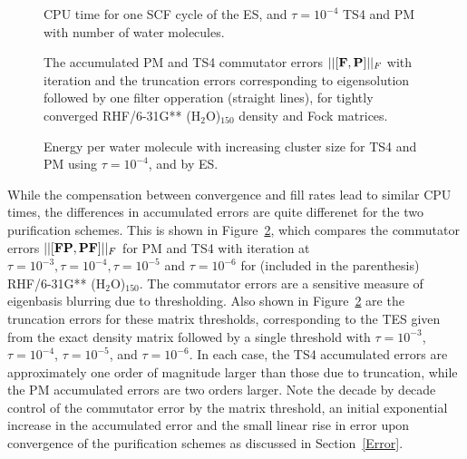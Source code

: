 \commentoutA{\documentclass[prb,aps,twocolumn,twocolumngrid,secnumarabic,superbib,hyperref]{revtex4}}
\begin{document}
{\begin{figure}[b]
\caption{CPU time for one SCF cycle of the ES, and 
	 $\tau=10^{-4}$ TS4 and PM with number of water molecules.}\label{cputimes}
\end{figure}

\begin{figure}[b]
\caption{The accumulated PM and TS4 commutator errors $||[{\bf F ,P }]||_F$ 
with iteration and the truncation errors corresponding to eigensolution followed
by one filter opperation (straight lines), for tightly converged RHF/6-31G** (H$_2$O)$_{150}$ density 
and Fock matrices.}\label{commerrors}
\end{figure}

\begin{figure}[b]
\caption{Energy per water molecule with increasing cluster size for TS4 and PM 
         using $\tau=10^{-4}$, and by ES.}\label{waterenergyerrors}
\end{figure}

While the compensation between convergence and fill rates lead to similar CPU times, 
the differences in accumulated errors are quite differenet for the two purification schemes.
This is shown in Figure~\ref{commerrors}, which compares the commutator errors $||[{\bf FP,PF}]||_F$
for PM and TS4 with iteration at $\tau=10^{-3}, \tau=10^{-4}, \tau=10^{-5}$ and $\tau=10^{-6}$
for (included in the parenthesis) RHF/6-31G** (H$_2$O)$_{150}$. 
The commutator errors are a sensitive measure of eigenbasis
blurring due to thresholding.  Also shown in Figure~\ref{commerrors} 
are the truncation errors for these matrix thresholds, corresponding to the TES 
given from the exact density matrix followed by a single threshold with
$\tau = 10 ^{-3}$, $\tau = 10 ^{-4}$, $\tau = 10 ^{-5}$, and $\tau = 10 ^{-6}$.  
In each case, the TS4 accumulated errors are approximately one order of 
magnitude larger than those due to truncation, while the PM accumulated errors are two
orders larger.  Note the decade by decade control of the commutator error by the matrix
threshold, an initial exponential increase in the accumulated error and the 
small linear rise in error upon convergence of the purification schemes as discussed
in Section~\ref{Error}.


}
\end{document}

